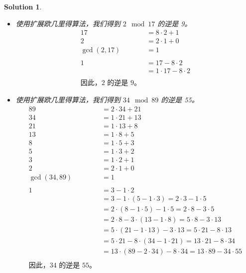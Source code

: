 \documentclass[UTF8]{report}
\newtheorem{solution}{Solution}
\theoremstyle{MyLineTheoremStyle} %
\theoremstyle{MyBlockTheoremStyle} %
\theoremstyle{MySubsubsectionStyle} %
\begin{document}
\begin{solution}
    \begin{itemize}
        \item[a)] 使用扩展欧几里得算法，我们得到 \( 2 \mod 17 \) 的逆是 9。
        \[
        \begin{aligned}
            17 &= 8 \cdot 2 + 1 \\
            2 &= 2 \cdot 1 + 0 \\
            \gcd(2, 17) &= 1 \\
            \\
            1 &= 17 - 8 \cdot 2 \\
            &= 1 \cdot 17 - 8 \cdot 2 \\
            \\
            \text{因此，2 的逆是 9。}
        \end{aligned}
        \]

        \item[b)] 使用扩展欧几里得算法，我们得到 \( 34 \mod 89 \) 的逆是 55。
        \[
        \begin{aligned}
            89 &= 2 \cdot 34 + 21 \\
            34 &= 1 \cdot 21 + 13 \\
            21 &= 1 \cdot 13 + 8 \\
            13 &= 1 \cdot 8 + 5 \\
            8 &= 1 \cdot 5 + 3 \\
            5 &= 1 \cdot 3 + 2 \\
            3 &= 1 \cdot 2 + 1 \\
            2 &= 2 \cdot 1 + 0 \\
            \gcd(34, 89) &= 1 \\
            \\
            1 &= 3 - 1 \cdot 2 \\
              &= 3 - 1 \cdot (5 - 1 \cdot 3) = 2 \cdot 3 - 1 \cdot 5 \\
              &= 2 \cdot (8 - 1 \cdot 5) - 1 \cdot 5 = 2 \cdot 8 - 3 \cdot 5 \\
              &= 2 \cdot 8 - 3 \cdot (13 - 1 \cdot 8) = 5 \cdot 8 - 3 \cdot 13 \\
              &= 5 \cdot (21 - 1 \cdot 13) - 3 \cdot 13 = 5 \cdot 21 - 8 \cdot 13 \\
              &= 5 \cdot 21 - 8 \cdot (34 - 1 \cdot 21) = 13 \cdot 21 - 8 \cdot 34 \\
              &= 13 \cdot (89 - 2 \cdot 34) - 8 \cdot 34 = 13 \cdot 89 - 34 \cdot 55 \\
            \\
            \text{因此，34 的逆是 55。}
        \end{aligned}
        \]


\end{itemize}
\end{solution}
\end{document}
